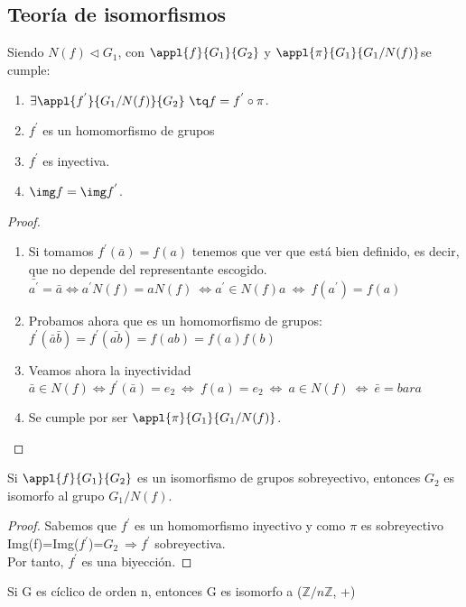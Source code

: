 \documentclass[nochap]{apuntes}
\begin{document}
\subsection{Teoría de isomorfismos}
\begin{theorem}
 Siendo $N(f)\lhd G_1$, con $\appl{f}{G_1}{G_2}$ y $\appl{\pi}{G_1}{G_1/N(f)}$se cumple:
 \begin{enumerate}
  \item $\exists \appl{f^{'}}{G_1/N(f)}{G_2} \ \tq f=f^{'}\circ \pi$.
  \item $f^{'}$  es un homomorfismo de grupos
  \item $f^{'}$  es inyectiva.
  \item $\img f =\img f^{'}$.
 \end{enumerate}
\end{theorem}

\begin{proof}
 \begin{enumerate}
  \item Si tomamos $f^{'}(\bar{a})=f(a)$  tenemos que ver que está bien definido, es decir, que no depende del representante escogido.\\
  $\bar{a^{'}}=\bar{a} \Leftrightarrow a^{'}N(f)=aN(f) \ \Leftrightarrow a^{'}\in N(f)a \ \Leftrightarrow \ f(a^{'})=f(a)$
  \item Probamos ahora que es un homomorfismo de grupos:\\
  $ f^{'}(\bar{a}\bar{b})=f^{'}(\bar{ab})=f(ab)=f(a)f(b)$
  \item Veamos ahora la inyectividad\\
  $\bar{a}\in N(f) \Leftrightarrow f^{'}(\bar{a})=e_2 \ \Leftrightarrow \ f(a)=e_2 \ \Leftrightarrow \ a\in N(f) \ \Leftrightarrow \ \bar{e}=bar{a}$
  \item Se cumple por ser $\appl{\pi}{G_1}{G_1/N(f)}$.
 \end{enumerate}
\end{proof}

\begin{theorem}\label{thmIsoGrII}
 Si $\appl{f}{G_1}{G_2}$  es un isomorfismo de grupos sobreyectivo, entonces $G_2$  es isomorfo al grupo $G_1/N(f)$.
\end{theorem}
\begin{proof}
 Sabemos que $f^{'}$  es un homomorfismo inyectivo y como $\pi$  es sobreyectivo Img(f)=Img($f^{'}$)=$G_2 \ \Rightarrow f^{'}$ sobreyectiva.\\
 Por tanto, $f^{'}$  es una biyección.
\end{proof}
\begin{corol}
 Si G es cíclico de orden n, entonces G es isomorfo a ($\mathbb{Z}/n\mathbb{Z}$, +)
\end{corol}
\end{document}
